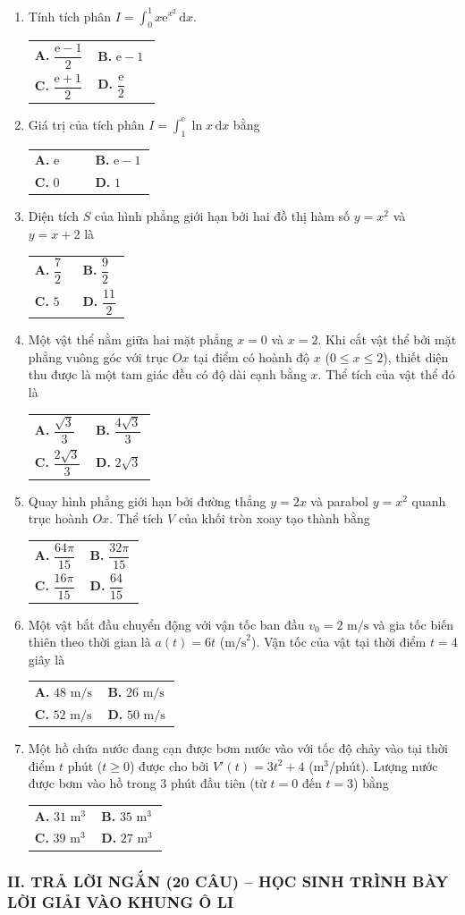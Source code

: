 \documentclass[12pt,a4paper]{article}
\makeatletter
\newcommand{\bonpa}[4]{\par\nobreak\smallskip\nobreak\noindent
\begin{tabular}{@{}p{0.48\linewidth}p{0.48\linewidth}@{}}
\textbf{A.} #1 & \textbf{B.} #2\\[7pt]
\textbf{C.} #3 & \textbf{D.} #4\end{tabular}}
\makeatother
\begin{document}
\begin{enumerate}[start=16]
\item Tính tích phân $I = \int_0^1 x\mathrm{e}^{x^2}\,\mathrm{d}x$.
\bonpa{$\dfrac{\mathrm{e} - 1}{2}$}{$\mathrm{e} - 1$}{$\dfrac{\mathrm{e} + 1}{2}$}{$\dfrac{\mathrm{e}}{2}$}

\item Giá trị của tích phân $I = \int_1^{\mathrm{e}} \ln x\,\mathrm{d}x$ bằng
\bonpa{$\mathrm{e}$}{$\mathrm{e} - 1$}{$0$}{$1$}

\item Diện tích $S$ của hình phẳng giới hạn bởi hai đồ thị hàm số $y = x^2$ và $y = x + 2$ là
\bonpa{$\dfrac{7}{2}$}{$\dfrac{9}{2}$}{$5$}{$\dfrac{11}{2}$}

\item Một vật thể nằm giữa hai mặt phẳng $x = 0$ và $x = 2$. Khi cắt vật thể bởi mặt phẳng vuông góc với trục $Ox$ tại điểm có hoành độ $x$ ($0 \le x \le 2$), thiết diện thu được là một tam giác đều có độ dài cạnh bằng $x$. Thể tích của vật thể đó là
\bonpa{$\dfrac{\sqrt{3}}{3}$}{$\dfrac{4\sqrt{3}}{3}$}{$\dfrac{2\sqrt{3}}{3}$}{$2\sqrt{3}$}

\item Quay hình phẳng giới hạn bởi đường thẳng $y = 2x$ và parabol $y = x^2$ quanh trục hoành $Ox$. Thể tích $V$ của khối tròn xoay tạo thành bằng
\bonpa{$\dfrac{64\pi}{15}$}{$\dfrac{32\pi}{15}$}{$\dfrac{16\pi}{15}$}{$\dfrac{64}{15}$}

\item Một vật bắt đầu chuyển động với vận tốc ban đầu $v_0 = 2\text{ m/s}$ và gia tốc biến thiên theo thời gian là $a(t) = 6t$ ($\text{m/s}^2$). Vận tốc của vật tại thời điểm $t = 4$ giây là
\bonpa{$48\text{ m/s}$}{$26\text{ m/s}$}{$52\text{ m/s}$}{$50\text{ m/s}$}

\item Một hồ chứa nước đang cạn được bơm nước vào với tốc độ chảy vào tại thời điểm $t$ phút ($t \ge 0$) được cho bởi $V'(t) = 3t^2 + 4$ ($\text{m}^3$/phút). Lượng nước được bơm vào hồ trong $3$ phút đầu tiên (từ $t = 0$ đến $t = 3$) bằng
\bonpa{$31\text{ m}^3$}{$35\text{ m}^3$}{$39\text{ m}^3$}{$27\text{ m}^3$}
\end{enumerate}

\subsubsection*{II. TRẢ LỜI NGẮN (20 CÂU) -- HỌC SINH TRÌNH BÀY LỜI GIẢI VÀO KHUNG Ô LI}
\end{document}
